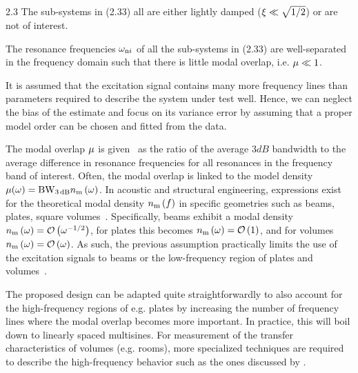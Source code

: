 \documentclass{responseletter}
\begin{document}
\begin{enumerate}
\begin{newquote}
\begin{assumption} {2.3}
The sub-systems in (2.33) all are either lightly damped ($\damping \ll \sqrt{1/2}$) or are not of interest.
\end{assumption}

\begin{assumption}{2.4}
The resonance frequencies $\wn[i]$ of all the sub-systems in (2.33) are well-separated in the frequency domain such that there is little modal overlap, i.e. $\modalOverlap \ll 1$.
\end{assumption}

\begin{assumption}{2.5}
It is assumed that the excitation signal contains many more frequency lines than parameters required to describe the system under test well.
Hence, we can neglect the bias of the estimate and focus on its variance error by assuming that a proper model order can be chosen and fitted from the data.
\end{assumption}

\begin{remark}{2.3}
The modal overlap $\modalOverlap$ is given~\citep{Ege2009} as the ratio of the average $3\unit{dB}$ bandwidth to the average difference in resonance frequencies for all resonances in the frequency band of interest.
Often, the modal overlap is linked to the model density $\modalOverlap(\omega) = \wdB \modalDensity{\omega}$.
In acoustic and structural engineering, expressions exist for the theoretical modal density $\modalDensity{f}$ in specific geometries such as beams, plates, square volumes~\citep{Hart1971,Bies2009}.
Specifically, beams exhibit a modal density $\modalDensity{\omega} = \bigO{\omega^{-1/2}}$, for plates this becomes $\modalDensity{\omega} = \bigO{1}$, and for volumes $\modalDensity{\omega} = \bigO{\omega}$.
As such, the previous assumption practically limits the use of the excitation signals to beams or the low-frequency region of plates and volumes~\citep{Ege2009}.
\end{remark}
\end{newquote}
\begin{newquote}
\begin{remark}{2.14}
The proposed design can be adapted quite straightforwardly to also account for the high-frequency regions of e.g. plates by increasing the number of frequency lines where the modal overlap becomes more important.
In practice, this will boil down to linearly spaced multisines.
For measurement of the transfer characteristics of volumes (e.g. rooms), more specialized techniques are required to describe the high-frequency behavior such as the ones discussed by \citet{Ege2009}.
\end{remark}
\end{newquote}


\end{enumerate}
\end{document}
